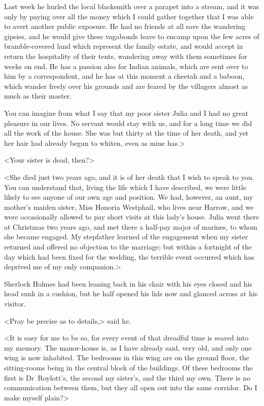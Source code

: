 Last week he hurled the local blacksmith over a parapet into a stream, and it was only by paying over all the money which I could gather together that I was able to avert another public exposure. He had no friends at all save the wandering gipsies, and he would give these vagabonds leave to encamp upon the few acres of bramble-covered land which represent the family estate, and would accept in return the hospitality of their tents, wandering away with them sometimes for weeks on end. He has a passion also for Indian animals, which are sent over to him by a correspondent, and he has at this moment a cheetah and a baboon, which wander freely over his grounds and are feared by the villagers almost as much as their master.

You can imagine from what I say that my poor sister Julia and I had no great pleasure in our lives. No servant would stay with us, and for a long time we did all the work of the house. She was but thirty at the time of her death, and yet her hair had already begun to whiten, even as mine has.>

<Your sister is dead, then?>

<She died just two years ago, and it is of her death that I wish to speak to you. You can understand that, living the life which I have described, we were little likely to see anyone of our own age and position. We had, however, an aunt, my mother's maiden sister, Miss Honoria Westphail, who lives near Harrow, and we were occasionally allowed to pay short visits at this lady's house. Julia went there at Christmas two years ago, and met there a half-pay major of marines, to whom she became engaged. My stepfather learned of the engagement when my sister returned and offered no objection to the marriage; but within a fortnight of the day which had been fixed for the wedding, the terrible event occurred which has deprived me of my only companion.>

Sherlock Holmes had been leaning back in his chair with his eyes closed and his head sunk in a cushion, but he half opened his lids now and glanced across at his visitor.

<Pray be precise as to details,> said he.

<It is easy for me to be so, for every event of that dreadful time is seared into my memory. The manor-house is, as I have already said, very old, and only one wing is now inhabited. The bedrooms in this wing are on the ground floor, the sitting-rooms being in the central block of the buildings. Of these bedrooms the first is Dr~Roylott's, the second my sister's, and the third my own. There is no communication between them, but they all open out into the same corridor. Do I make myself plain?>

